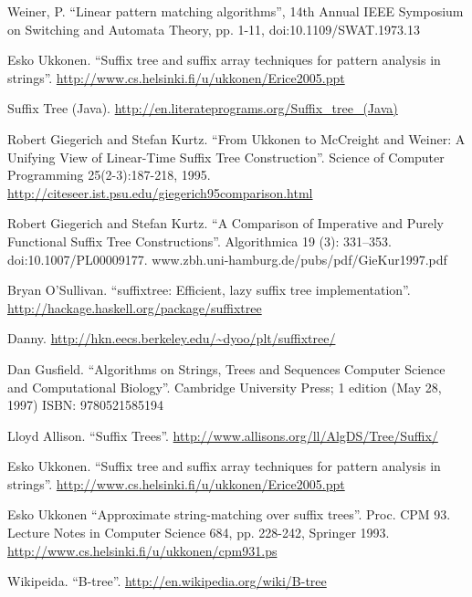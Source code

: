 \documentclass[b5paper]{ctexart}
\begin{document}
\begin{thebibliography}{99}
Weiner, P. ``Linear pattern matching algorithms'', 14th Annual IEEE Symposium on Switching and Automata Theory, pp. 1-11, doi:10.1109/SWAT.1973.13

Esko Ukkonen. ``Suffix tree and suffix array techniques for pattern analysis in strings''. \url{http://www.cs.helsinki.fi/u/ukkonen/Erice2005.ppt}

Suffix Tree (Java). \url{http://en.literateprograms.org/Suffix_tree_(Java)}

Robert Giegerich and Stefan Kurtz. ``From Ukkonen to McCreight and Weiner: A Unifying View of Linear-Time Suffix Tree Construction''. Science of Computer Programming 25(2-3):187-218, 1995. \url{http://citeseer.ist.psu.edu/giegerich95comparison.html}

Robert Giegerich and Stefan Kurtz. ``A Comparison of Imperative and Purely Functional Suffix Tree Constructions''. Algorithmica 19 (3): 331--353. doi:10.1007/PL00009177. www.zbh.uni-hamburg.de/pubs/pdf/GieKur1997.pdf

Bryan O'Sullivan. ``suffixtree: Efficient, lazy suffix tree implementation''. \url{http://hackage.haskell.org/package/suffixtree}

Danny. \url{http://hkn.eecs.berkeley.edu/~dyoo/plt/suffixtree/}

Dan Gusfield. ``Algorithms on Strings, Trees and Sequences Computer Science and Computational Biology''. Cambridge University Press; 1 edition (May 28, 1997) ISBN: 9780521585194

Lloyd Allison. ``Suffix Trees''. \url{http://www.allisons.org/ll/AlgDS/Tree/Suffix/}

Esko Ukkonen. ``Suffix tree and suffix array techniques for pattern analysis in strings''. \url{http://www.cs.helsinki.fi/u/ukkonen/Erice2005.ppt}

Esko Ukkonen ``Approximate string-matching over suffix trees''. Proc. CPM 93. Lecture Notes in Computer Science 684, pp. 228-242, Springer 1993. \url{http://www.cs.helsinki.fi/u/ukkonen/cpm931.ps}


Wikipeida. ``B-tree''. \url{http://en.wikipedia.org/wiki/B-tree}



\end{thebibliography}
\end{document}
